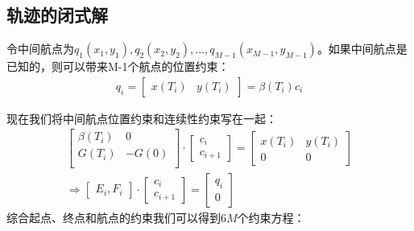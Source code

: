 \documentclass[master,academic]{ysuthesis} %
\begin{document}
		\subsection{轨迹的闭式解} 
		令中间航点为$q_1(x_1,y_1),q_2(x_2,y_2),...,q_{M-1}(x_{M-1},y_{M-1})$。如果中间航点是已知的，则可以带来M-1个航点的位置约束：
		\begin{equation}
			\begin{aligned}
				q_i = \begin{bmatrix}
					x(T_i)& y(T_i)
				\end{bmatrix} = \beta(T_i)c_i
			\end{aligned}
		\end{equation}
		
		现在我们将中间航点位置约束和连续性约束写在一起：
		\begin{equation}
			\begin{aligned}
				\left[ \begin{matrix}
					\beta ( T_i )&		0\\
					G( T_i )&		-G( 0 )\\
				\end{matrix} \right] \cdot \begin{bmatrix}
					c_i \\
					c_{i+1}
				\end{bmatrix}
				= \begin{bmatrix}
					x(T_i) &y(T_i)\\
					0& 0
				\end{bmatrix} \\
				\Longrightarrow \begin{bmatrix} E_i,F_i \end{bmatrix} \cdot \begin{bmatrix}
					c_i \\
					c_{i+1}
				\end{bmatrix} =\begin{bmatrix}
					q_i\\
					0
				\end{bmatrix}
			\end{aligned}
		\end{equation}
		综合起点、终点和航点的约束我们可以得到$6M$个约束方程：
\end{document}

